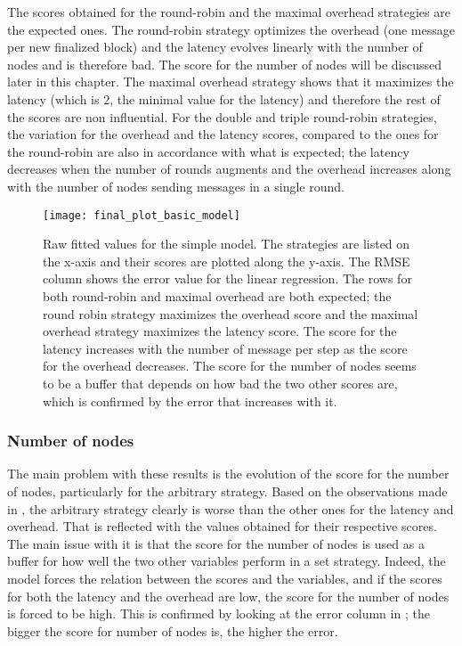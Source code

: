 The scores obtained for the round-robin and the maximal overhead strategies are
the expected ones. The round-robin strategy optimizes the overhead (one message
per new finalized block) and the latency evolves linearly with the number of
nodes and is therefore bad. The score for the number of nodes will be discussed
later in this chapter. The maximal overhead strategy shows that it maximizes the
latency (which is \(2\), the minimal value for the latency) and therefore the
rest of the scores are non influential.
For the double and triple round-robin strategies, the variation for the overhead
and the latency scores, compared to the ones for the round-robin are also in
accordance with what is expected; the latency decreases when the number of
rounds augments and the overhead increases along with the number of nodes
sending messages in a single round.

\begin{figure}[h]
    \centering
    \texttt{[image: final\_plot\_basic\_model]}
    \captionsetup{justification=centering}
    \caption{Raw fitted values for the simple model. The strategies are listed
    on the x-axis and their scores are plotted along the y-axis. The RMSE column shows the error value for the linear
        regression. The rows for both round-robin and maximal overhead are both
        expected; the round robin strategy maximizes the overhead score and the
        maximal overhead strategy maximizes the latency score. The score for the
        latency increases with the number of message per step as the score for
        the overhead decreases. The score for the number of nodes seems to be a
        buffer that depends on how bad the two other scores are, which is
        confirmed by the error that increases with it.
    }
    \label{fig:recapTestsPlot}
\end{figure}

\subsubsection{Number of nodes}
\label{ssec:nbNodes}
The main problem with these results is the evolution of the score for the number
of nodes, particularly for the arbitrary strategy. Based on the observations
made in , the arbitrary strategy clearly is worse than the
other ones for the latency and overhead. That is reflected with the values
obtained for their respective scores. The main issue with it is that the score
for the number of nodes is used as a buffer for how well the two other variables
perform in a set strategy. Indeed, the model forces the relation between the
scores and the variables, and if the scores for both the latency and the
overhead are low, the score for the number of nodes is forced to be high. This
is confirmed by looking at the error column in ; the bigger
the score for number of nodes is, the higher the error.

